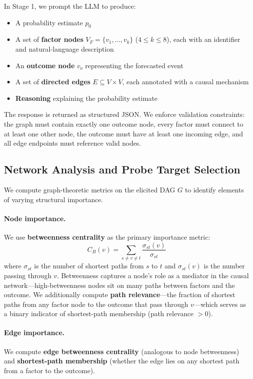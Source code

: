 \documentclass[11pt]{article}
\begin{document}
In Stage 1, we prompt the LLM to produce:
\begin{itemize}
    \item A probability estimate $p_0$
    \item A set of \textbf{factor nodes} $V_F = \{v_1, \ldots, v_k\}$ ($4 \leq k \leq 8$), each with an identifier and natural-language description
    \item An \textbf{outcome node} $v_o$ representing the forecasted event
    \item A set of \textbf{directed edges} $E \subseteq V \times V$, each annotated with a causal mechanism
    \item \textbf{Reasoning} explaining the probability estimate
\end{itemize}

The response is returned as structured JSON. We enforce validation constraints: the graph must contain exactly one outcome node, every factor must connect to at least one other node, the outcome must have at least one incoming edge, and all edge endpoints must reference valid nodes. 

\subsection{Network Analysis and Probe Target Selection}
\label{sec:network}

We compute graph-theoretic metrics on the elicited DAG $G$ to identify elements of varying structural importance.

\paragraph{Node importance.} We use \textbf{betweenness centrality} as the primary importance metric:
\begin{equation}
    C_B(v) = \sum_{s \neq v \neq t} \frac{\sigma_{st}(v)}{\sigma_{st}}
\end{equation}
where $\sigma_{st}$ is the number of shortest paths from $s$ to $t$ and $\sigma_{st}(v)$ is the number passing through $v$. Betweenness captures a node's role as a mediator in the causal network---high-betweenness nodes sit on many paths between factors and the outcome. We additionally compute \textbf{path relevance}---the fraction of shortest paths from any factor node to the outcome that pass through $v$---which serves as a binary indicator of shortest-path membership (path relevance $> 0$).

\paragraph{Edge importance.} We compute \textbf{edge betweenness centrality} (analogous to node betweenness) and \textbf{shortest-path membership} (whether the edge lies on any shortest path from a factor to the outcome).
\end{document}
